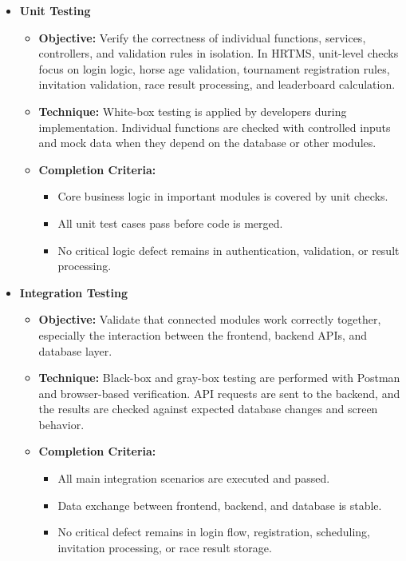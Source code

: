 \begin{itemize}
    \item \textbf{Unit Testing}
    \begin{itemize}
        \item \textbf{Objective:} Verify the correctness of individual functions, services, controllers, and validation rules in isolation. In HRTMS, unit-level checks focus on login logic, horse age validation, tournament registration rules, invitation validation, race result processing, and leaderboard calculation.
        \item \textbf{Technique:} White-box testing is applied by developers during implementation. Individual functions are checked with controlled inputs and mock data when they depend on the database or other modules.
        \item \textbf{Completion Criteria:}
        \begin{itemize}
            \item Core business logic in important modules is covered by unit checks.
            \item All unit test cases pass before code is merged.
            \item No critical logic defect remains in authentication, validation, or result processing.
        \end{itemize}
    \end{itemize}

    \item \textbf{Integration Testing}
    \begin{itemize}
        \item \textbf{Objective:} Validate that connected modules work correctly together, especially the interaction between the frontend, backend APIs, and database layer.
        \item \textbf{Technique:} Black-box and gray-box testing are performed with Postman and browser-based verification. API requests are sent to the backend, and the results are checked against expected database changes and screen behavior.
        \item \textbf{Completion Criteria:}
        \begin{itemize}
            \item All main integration scenarios are executed and passed.
            \item Data exchange between frontend, backend, and database is stable.
            \item No critical defect remains in login flow, registration, scheduling, invitation processing, or race result storage.
        \end{itemize}
    \end{itemize}


\end{itemize}
